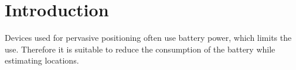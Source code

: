 \section{Introduction}
Devices used for pervasive positioning often use battery power, which limits the use. Therefore it is suitable to reduce the consumption of the battery while estimating locations. 